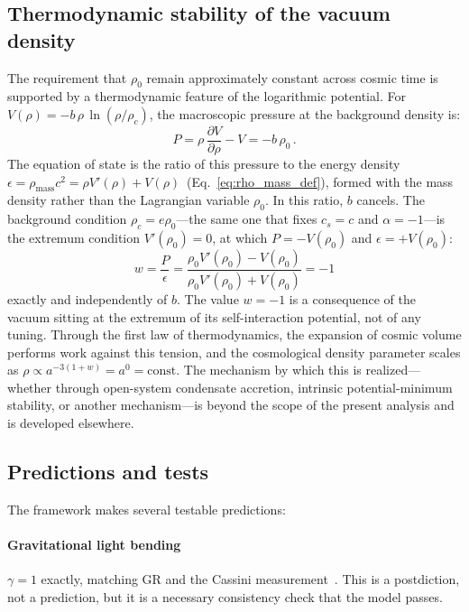 \documentclass[12pt, a4paper]{article}
\begin{document}
\subsection{Thermodynamic stability of the vacuum density}

The requirement that $\rho_0$ remain approximately constant across cosmic time is supported by a thermodynamic feature of the logarithmic potential. For $V(\rho) = -b\,\rho\,\ln(\rho/\rho_c)$, the macroscopic pressure at the background density is:
\begin{equation}
    P = \rho\,\frac{\partial V}{\partial\rho} - V = -b\,\rho_0\,.
\label{eq:pressure}
\end{equation}
The equation of state is the ratio of this pressure to the energy density $\epsilon = \rho_{\mathrm{mass}}c^2 = \rho V'(\rho) + V(\rho)$~(Eq.~\ref{eq:rho_mass_def}), formed with the mass density rather than the Lagrangian variable $\rho_0$. In this ratio, $b$ cancels. The background condition $\rho_c = e\rho_0$---the same one that fixes $c_s = c$ and $\alpha = -1$---is the extremum condition $V'(\rho_0) = 0$, at which $P = -V(\rho_0)$ and $\epsilon = +V(\rho_0)$:
\begin{equation}
    \boxed{\;w = \frac{P}{\epsilon} = \frac{\rho_0 V'(\rho_0) - V(\rho_0)}{\rho_0 V'(\rho_0) + V(\rho_0)} = -1\;}
\label{eq:w_exact}
\end{equation}
exactly and independently of $b$. The value $w = -1$ is a consequence of the vacuum sitting at the extremum of its self-interaction potential, not of any tuning. Through the first law of thermodynamics, the expansion of cosmic volume performs work against this tension, and the cosmological density parameter scales as $\rho \propto a^{-3(1+w)} = a^0 = \text{const}$. The mechanism by which this is realized---whether through open-system condensate accretion, intrinsic potential-minimum stability, or another mechanism---is beyond the scope of the present analysis and is developed elsewhere.

\subsection{Predictions and tests}

The framework makes several testable predictions:

\paragraph{Gravitational light bending} $\gamma = 1$ exactly, matching GR and the Cassini measurement~\cite{bertotti_2003}. This is a postdiction, not a prediction, but it is a necessary consistency check that the model passes.
\end{document}
